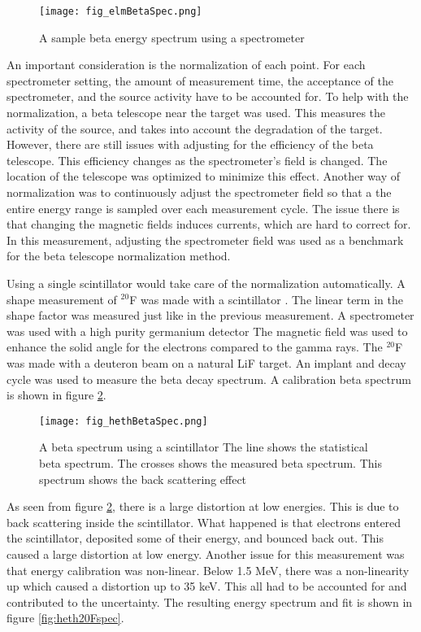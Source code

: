 \documentclass[main.tex]{subfiles}
\begin{document}
\begin{figure}[!htb]
	\centerline{\texttt{[image: fig\_elmBetaSpec.png]}}
	\caption{A sample beta energy spectrum using a spectrometer \cite{Elm87}}
	\label{fig:elmspec}
\end{figure}

An important consideration is the normalization of each point.
For each spectrometer setting, the amount of measurement time, the acceptance of the spectrometer, and the source activity have to be accounted for.
To help with the normalization, a beta telescope near the target was used.
This measures the activity of the source, and takes into account the degradation of the target.
However, there are still issues with adjusting for the efficiency of the beta telescope.
This efficiency changes as the spectrometer's field is changed.
The location of the telescope was optimized to minimize this effect.
Another way of normalization was to continuously adjust the spectrometer field so that a the entire energy range is sampled over each measurement cycle.
The issue there is that changing the magnetic fields induces currents, which are hard to correct for. 
In this measurement, adjusting the spectrometer field was used as a benchmark for the beta telescope normalization method.

Using a single scintillator would take care of the normalization automatically. 
A shape measurement of $^{20}$F was made with a scintillator \cite{Het89}.
The linear term in the shape factor was measured just like in the previous measurement.
A spectrometer was used with a high purity germanium detector
The magnetic field was used to enhance the solid angle for the electrons compared to the gamma rays.
The $^{20}$F was made with a deuteron beam on a natural LiF target. 
An implant and decay cycle was used to measure the beta decay spectrum. 
A calibration beta spectrum is shown in figure \ref{fig:hethspec}.

\begin{figure}[!htb]
	\centerline{\texttt{[image: fig\_hethBetaSpec.png]}}
	\caption{A beta spectrum using a scintillator \cite{Het89}
		    The line shows the statistical beta spectrum.
		    The crosses shows the measured beta spectrum.
		    This spectrum shows the back scattering effect}
	\label{fig:hethspec}
\end{figure}

As seen from figure \ref{fig:hethspec}, there is a large distortion at low energies.
This is due to back scattering inside the scintillator.
What happened is that electrons entered the scintillator, deposited some of their energy, and bounced back out.
This caused a large distortion at low energy.
Another issue for this measurement was that energy calibration was non-linear.
Below 1.5 MeV, there was a non-linearity up which caused a distortion up to 35 keV. 
This all had to be accounted for and contributed to the uncertainty.
The resulting energy spectrum and fit is shown in figure \ref{fig:heth20Fspec}.
\end{document}
